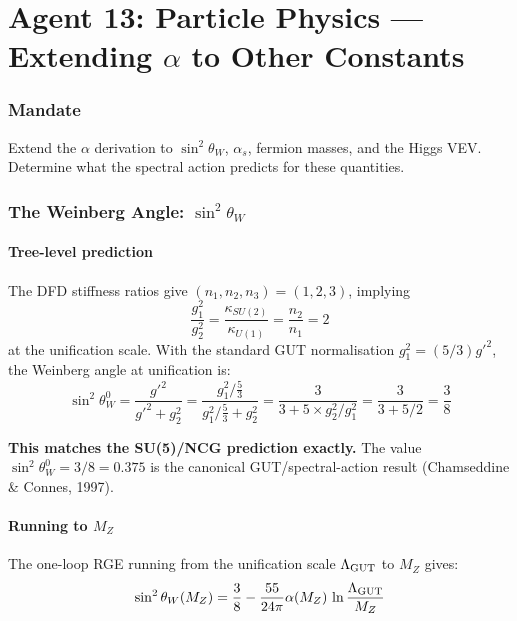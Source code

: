 \documentclass[11pt,a4paper]{article}
\begin{document}
\part{Agent 13: Particle Physics --- Extending $\alpha$ to Other Constants}
\label{part:agent13}

\section{Mandate}
Extend the $\alpha$ derivation to $\sin^2\theta_W$, $\alpha_s$, fermion masses, and the Higgs VEV. Determine what the spectral action predicts for these quantities.

\section{The Weinberg Angle: $\sin^2\theta_W$}

\subsection{Tree-level prediction}

The DFD stiffness ratios give $(n_1, n_2, n_3) = (1, 2, 3)$, implying
\begin{equation}
\frac{g_1^2}{g_2^2} = \frac{\kappa_{SU(2)}}{\kappa_{U(1)}} = \frac{n_2}{n_1} = 2
\end{equation}
at the unification scale. With the standard GUT normalisation $g_1^2 = (5/3)g'^2$, the Weinberg angle at unification is:
\begin{equation}
\sin^2\theta_W^0 = \frac{g'^2}{g'^2 + g_2^2} = \frac{g_1^2/\frac{5}{3}}{g_1^2/\frac{5}{3} + g_2^2} = \frac{3}{3 + 5 \times g_2^2/g_1^2} = \frac{3}{3 + 5/2} = \frac{3}{8}
\end{equation}

\textbf{This matches the SU(5)/NCG prediction exactly.} The value $\sin^2\theta_W^0 = 3/8 = 0.375$ is the canonical GUT/spectral-action result (Chamseddine \& Connes, 1997).

\subsection{Running to $M_Z$}

The one-loop RGE running from the unification scale $\Lambda_{\rm GUT}$ to $M_Z$ gives:
\begin{equation}
\sin^2\theta_W(M_Z) = \frac{3}{8} - \frac{55}{24\pi}\alpha(M_Z)\,\ln\frac{\Lambda_{\rm GUT}}{M_Z}
\end{equation}
\end{document}

